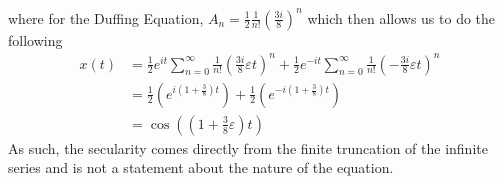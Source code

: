 \documentclass{article}
\begin{document}
where for the Duffing Equation, $A_n =\frac{1}{2}\frac{1}{n!}\left( \frac{3i}{8} \right)^n$ which then allows us to do the following 
\begin{equation*}
    \begin{split}
        x(t) &= \frac{1}{2}e^{it} \sum^\infty_{n=0} \frac{1}{n!}\left(\frac{3i}{8}\varepsilon t\right)^n  +\frac{1}{2}e^{-it} \sum^\infty_{n=0} \frac{1}{n!}\left(-\frac{3i}{8}\varepsilon t\right)^n   \\
        &= \frac{1}{2} \left( e^{i( 1 + \frac{3}{8})t} \right) +\frac{1}{2} \left( e^{-i( 1 + \frac{3}{8})t} \right)  \\
        &= \cos \left( \left( 1+ \frac{3}{8}\varepsilon \right)t\right)
    \end{split}
\end{equation*}
As such, the secularity comes directly from the finite truncation of the infinite series and is not a statement about the nature of the equation. 
\end{document}
